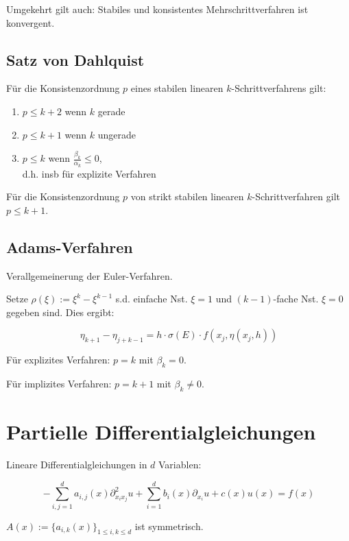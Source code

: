 \spacing

Umgekehrt gilt auch: Stabiles und konsistentes Mehrschrittverfahren ist konvergent.

\subsection*{Satz von Dahlquist}

Für die Konsistenzordnung $p$ eines stabilen linearen $k$-Schrittverfahrens gilt:

\begin{enumerate}
\item $p \leq k + 2$ wenn $k$ gerade
\item $p \leq k + 1$ wenn $k$ ungerade
\item $p \leq k$ wenn $\frac{\beta_k}{\alpha_k} \leq 0$,\\ d.h. insb für explizite Verfahren
\end{enumerate}

Für die Konsistenzordnung $p$ von strikt stabilen linearen $k$-Schrittverfahren gilt $p \leq k + 1$.

\subsection*{Adams-Verfahren}

Verallgemeinerung der Euler-Verfahren.

Setze $\rho(\xi) := \xi^k - \xi^{k-1}$ s.d. einfache Nst. $\xi=1$ und $(k-1)$-fache Nst. $\xi = 0$ gegeben sind. Dies ergibt:

\vspace*{-2mm}
$$\eta_{k+1}-\eta_{j+k-1} = h \cdot \sigma(E) \cdot f(x_j,\eta(x_j,h))$$

Für explizites Verfahren: $p = k$ mit $\beta_k = 0$.

Für implizites Verfahren: $p = k+1$ mit $\beta_k \neq 0$.

\section*{Partielle Differentialgleichungen}

Lineare Differentialgleichungen in $d$ Variablen:

\vspace*{-4mm}
$$-\sum_{i,j=1}^d a_{i,j}(x)\partial_{x_i x_j}^2 u + \sum_{i=1}^d b_i(x) \partial_{x_i} u + c(x)u(x) = f(x)$$

$A(x) := \{a_{i,k}(x)\}_{1\leq i,k \leq d}$ ist symmetrisch.


